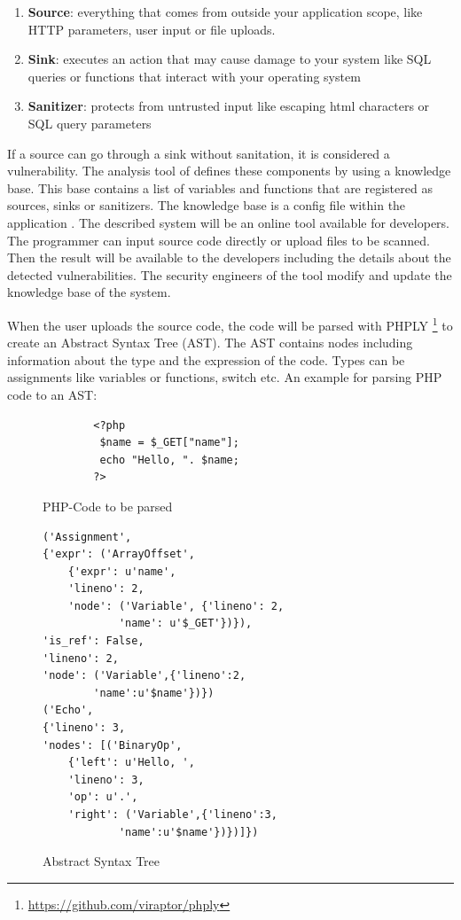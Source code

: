 \begin{enumerate}
    \item \textbf{Source}: everything that comes from outside your application scope, like HTTP parameters, user input or file uploads.
    \item \textbf{Sink}: executes an action that may cause damage to your system like SQL queries or functions that interact with your operating system
    \item \textbf{Sanitizer}: protects from untrusted input like escaping html characters or SQL query parameters
\end{enumerate}

If a source can go through a sink without sanitation, it is considered a vulnerability. The analysis tool of \textcite[]{Maskur2019} defines these components by using a knowledge base. This base contains a list of variables and functions that are registered as sources, sinks or sanitizers. The knowledge base is a config file within the application \autocite[3]{Maskur2019}. The described system will be an online tool available for developers. The programmer can input source code directly or upload files to be scanned. Then the result will be available to the developers including the details about the detected vulnerabilities. The security engineers of the tool modify and update the knowledge base of the system.\newline

When the user uploads the source code, the code will be parsed with PHPLY \footnote{ \url{https://github.com/viraptor/phply}} to create an Abstract Syntax Tree (AST). The AST contains nodes including information about the type and the expression of the code. Types can be assignments like variables or functions, switch etc. An example for parsing PHP code to an AST:

\begin{figure}[H]
\begin{verbatim}
        <?php
         $name = $_GET["name"];
         echo "Hello, ". $name;
        ?>  
\end{verbatim}
    \caption{PHP-Code to be parsed}
    \label{PHP}
\end{figure}

\begin{figure}[H]
\begin{verbatim}
('Assignment', 
{'expr': ('ArrayOffset',
    {'expr': u'name', 
    'lineno': 2, 
    'node': ('Variable', {'lineno': 2,
            'name': u'$_GET'})}),
'is_ref': False, 
'lineno': 2, 
'node': ('Variable',{'lineno':2,
        'name':u'$name'})}) 
('Echo',
{'lineno': 3, 
'nodes': [('BinaryOp',
    {'left': u'Hello, ', 
    'lineno': 3,
    'op': u'.', 
    'right': ('Variable',{'lineno':3,
            'name':u'$name'})})]})
\end{verbatim}
    \caption{Abstract Syntax Tree}  
    \label{AST}
\end{figure}

